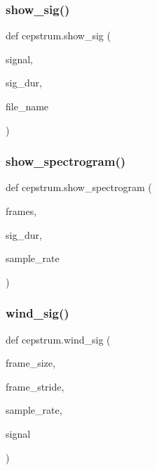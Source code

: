 \mbox{\label{namespacecepstrum_ae9a55612bcfeaa372d11036a16b98527}} 
\subsubsection{\texorpdfstring{show\+\_\+sig()}{show\_sig()}}
{\footnotesize\ttfamily def cepstrum.\+show\+\_\+sig (\begin{DoxyParamCaption}\item[{}]{signal,  }\item[{}]{sig\+\_\+dur,  }\item[{}]{file\+\_\+name }\end{DoxyParamCaption})}

\mbox{\label{namespacecepstrum_a3db8285f132510ae674c893a651ca971}} 
\subsubsection{\texorpdfstring{show\+\_\+spectrogram()}{show\_spectrogram()}}
{\footnotesize\ttfamily def cepstrum.\+show\+\_\+spectrogram (\begin{DoxyParamCaption}\item[{}]{frames,  }\item[{}]{sig\+\_\+dur,  }\item[{}]{sample\+\_\+rate }\end{DoxyParamCaption})}

\mbox{\label{namespacecepstrum_ab6397c51bd13894929df2b4c206fecfa}} 
\subsubsection{\texorpdfstring{wind\+\_\+sig()}{wind\_sig()}}
{\footnotesize\ttfamily def cepstrum.\+wind\+\_\+sig (\begin{DoxyParamCaption}\item[{}]{frame\+\_\+size,  }\item[{}]{frame\+\_\+stride,  }\item[{}]{sample\+\_\+rate,  }\item[{}]{signal }\end{DoxyParamCaption})}

